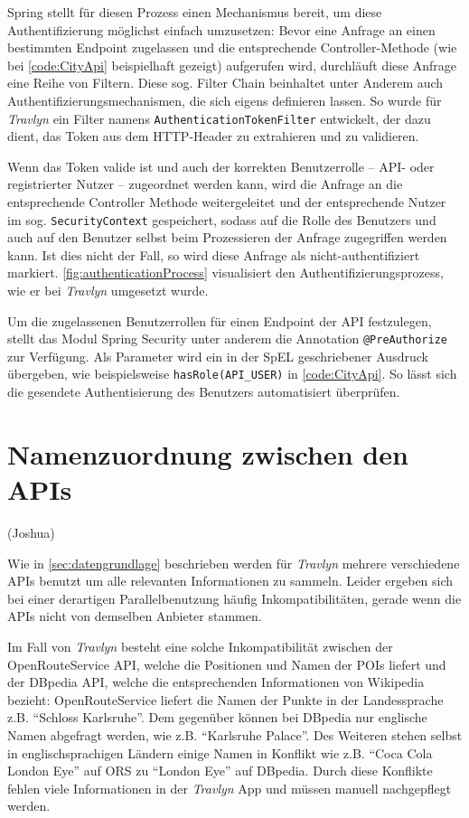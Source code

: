 		Spring stellt für diesen Prozess einen Mechanismus bereit, um diese Authentifizierung möglichst einfach umzusetzen: Bevor eine Anfrage an einen bestimmten Endpoint zugelassen und die entsprechende Controller-Methode (wie bei \autoref{code:CityApi} beispielhaft gezeigt) aufgerufen wird, durchläuft diese Anfrage eine Reihe von Filtern. Diese sog. Filter Chain beinhaltet unter Anderem auch Authentifizierungsmechanismen, die sich eigens definieren lassen. So wurde für \textit{Travlyn} ein Filter namens \lstinline|AuthenticationTokenFilter| entwickelt, der dazu dient, das Token aus dem \acs{HTTP}-Header zu extrahieren und zu validieren. 
		
		Wenn das Token valide ist und auch der korrekten Benutzerrolle -- \acs{API}- oder registrierter Nutzer -- zugeordnet werden kann, wird die Anfrage an die entsprechende Controller Methode weitergeleitet und der entsprechende Nutzer im sog. \lstinline|SecurityContext| gespeichert, sodass auf die Rolle des Benutzers und auch auf den Benutzer selbst beim Prozessieren der Anfrage zugegriffen werden kann. Ist dies nicht der Fall, so wird diese Anfrage als nicht-authentifiziert markiert. \autoref{fig:authenticationProcess} visualisiert den Authentifizierungsprozess, wie er bei \textit{Travlyn} umgesetzt wurde.
		
		Um die zugelassenen Benutzerrollen für einen Endpoint der \acs{API} festzulegen, stellt das Modul Spring Security unter anderem die Annotation \lstinline|@PreAuthorize| zur Verfügung. Als Parameter wird ein in der \ac{SpEL} geschriebener Ausdruck übergeben, wie beispielsweise \lstinline|hasRole(API_USER)| in \autoref{code:CityApi}. So lässt sich die gesendete Authentisierung des Benutzers automatisiert überprüfen.
		
	\section{Namenzuordnung zwischen den \acs{API}s}
	
	(Joshua)
	
	Wie in \autoref{sec:datengrundlage} beschrieben werden für \textit{Travlyn} mehrere verschiedene \acs{API}s benutzt um alle relevanten Informationen zu sammeln. Leider ergeben sich bei einer derartigen Parallelbenutzung häufig Inkompatibilitäten, gerade wenn die \acs{API}s nicht von demselben Anbieter stammen.
	
	\vspace{0.25cm}
	
	Im Fall von \textit{Travlyn} besteht eine solche Inkompatibilität zwischen der OpenRouteService \acs{API}, welche die Positionen und Namen der \acs{POI}s liefert und der DBpedia \acs{API}, welche die entsprechenden Informationen von Wikipedia bezieht: OpenRouteService liefert die Namen der Punkte in der Landessprache z.B. \enquote{Schloss Karlsruhe}. Dem gegenüber können bei DBpedia nur englische Namen abgefragt werden, wie z.B. \enquote{Karlsruhe Palace}. Des Weiteren stehen selbst in englischsprachigen Ländern einige Namen in Konflikt wie z.B. \enquote{Coca Cola London Eye} auf \acs{ORS} zu \enquote{London Eye} auf DBpedia. Durch diese Konflikte fehlen viele Informationen in der \textit{Travlyn} App und müssen manuell nachgepflegt werden.
	
